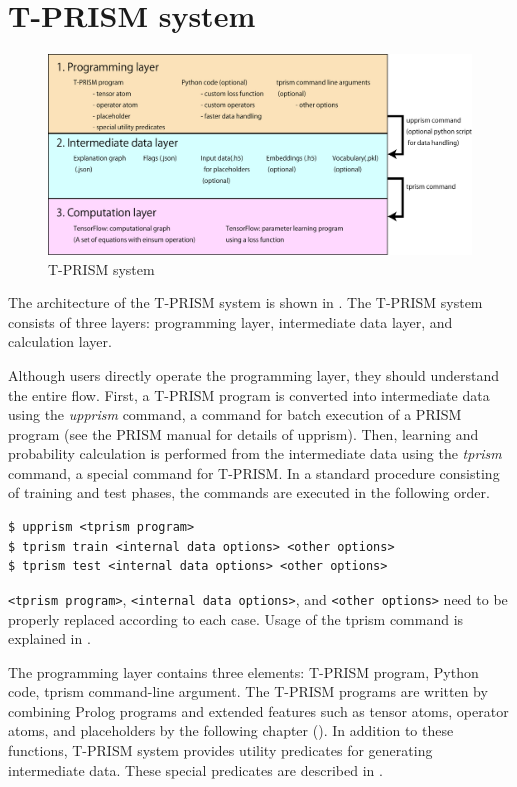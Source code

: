 \documentclass[a4paper]{report}
\begin{document}
\chapter{T-PRISM system}

\begin{figure}[tb]
	\centering
	\includegraphics[width=1.0\linewidth]{tprism_system.pdf}
	\caption[T-PRISM system]{T-PRISM system}
	\label{fig:tprismsystem}
\end{figure}


The architecture of the T-PRISM system is shown in .
The T-PRISM system consists of three layers: programming layer, intermediate data layer, and calculation layer.

Although users directly operate the programming layer, they should understand the entire flow.
First, a T-PRISM program is converted into intermediate data using the {\it upprism} command, a command for batch execution of a PRISM program
(see the PRISM manual for details of upprism).
Then, learning and probability calculation is performed from the intermediate data using the {\it tprism} command, a special command for T-PRISM.
In a standard procedure consisting of training and test phases, the commands are executed in the following order.


\begin{verbatim}
$ upprism <tprism program>
$ tprism train <internal data options> <other options>
$ tprism test <internal data options> <other options>
\end{verbatim}
\verb|<tprism program>|, \verb|<internal data options>|, and \verb|<other options>| need to be properly replaced according to each case.
Usage of the tprism command is explained in .



The programming layer contains three elements: T-PRISM program, Python code, tprism command-line argument.
The T-PRISM programs are written by combining Prolog programs and extended features such as tensor atoms, operator atoms, and placeholders by the following chapter ().
In addition to these functions, T-PRISM system provides utility predicates for generating intermediate data.
These special predicates are described in .
\end{document}
